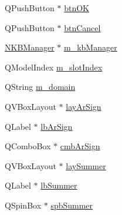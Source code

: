 \begin{DoxyCompactItemize}
\item 
QPushButton $\ast$ \hyperlink{class_expr_editor_a8604bf3ec0dc18c57d659ab5e30cd6a3}{btnOK}
\item 
QPushButton $\ast$ \hyperlink{class_expr_editor_ab5d219b7e1f2e638cff52daca84fc51d}{btnCancel}
\item 
\hyperlink{class_n_k_b_manager}{NKBManager} $\ast$ \hyperlink{class_expr_editor_a32a743cb86f6f7ed51b1b4e6ababee5f}{m\_\-kbManager}
\item 
QModelIndex \hyperlink{class_expr_editor_ad7865d3c9c0424a319cf937265c95a68}{m\_\-slotIndex}
\item 
QString \hyperlink{class_expr_editor_ab0f7f0b4608739854185f260bf481034}{m\_\-domain}
\item 
QVBoxLayout $\ast$ \hyperlink{class_expr_editor_a8c2f70f6030f45e96443bf75afb614ef}{layArSign}
\item 
QLabel $\ast$ \hyperlink{class_expr_editor_ae07c34b9202d8b1594874e1da7bf641e}{lbArSign}
\item 
QComboBox $\ast$ \hyperlink{class_expr_editor_a67b34d1b437ea1850eb4d347b143230c}{cmbArSign}
\item 
QVBoxLayout $\ast$ \hyperlink{class_expr_editor_a5d0bdf568726e16a97fc2ce38c9cedc1}{laySummer}
\item 
QLabel $\ast$ \hyperlink{class_expr_editor_a9e6cb92539ffa042c322bfb4c07086c9}{lbSummer}
\item 
QSpinBox $\ast$ \hyperlink{class_expr_editor_a672fb9b691a10117939b93927cb56cef}{spbSummer}
\end{DoxyCompactItemize}


